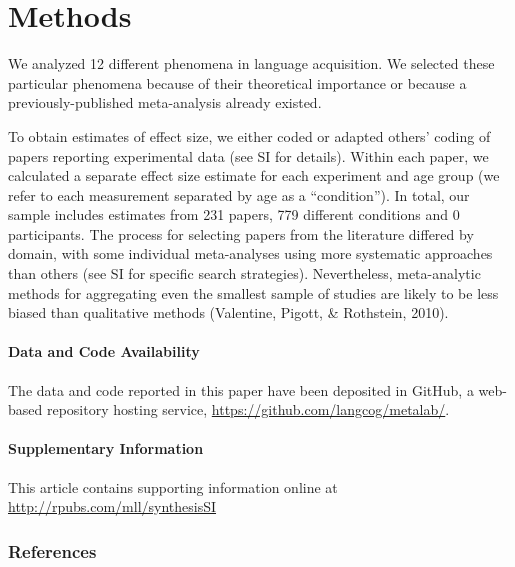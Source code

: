 \documentclass[english,floatsintext,man]{apa6}
\theoremstyle{definition}
\theoremstyle{definition}
\theoremstyle{remark}
\begin{document}
\section{Methods}\label{methods}

We analyzed 12 different phenomena in language acquisition. We selected
these particular phenomena because of their theoretical importance or
because a previously-published meta-analysis already existed.

To obtain estimates of effect size, we either coded or adapted others'
coding of papers reporting experimental data (see SI for details).
Within each paper, we calculated a separate effect size estimate for
each experiment and age group (we refer to each measurement separated by
age as a \enquote{condition}). In total, our sample includes estimates
from 231 papers, 779 different conditions and 0 participants. The
process for selecting papers from the literature differed by domain,
with some individual meta-analyses using more systematic approaches than
others (see SI for specific search strategies). Nevertheless,
meta-analytic methods for aggregating even the smallest sample of
studies are likely to be less biased than qualitative methods
(Valentine, Pigott, \& Rothstein, 2010).

\paragraph{Data and Code Availability}\label{data-and-code-availability}

The data and code reported in this paper have been deposited in GitHub,
a web-based repository hosting service,
\url{https://github.com/langcog/metalab/}.

\paragraph{Supplementary Information}\label{supplementary-information}

This article contains supporting information online at
\url{http://rpubs.com/mll/synthesisSI}

\newpage

\subsubsection{References}\label{references}

\setlength{\parindent}{-0.5in} \setlength{\leftskip}{0.5in}
\setlength{\parskip}{8pt}
\end{document}
